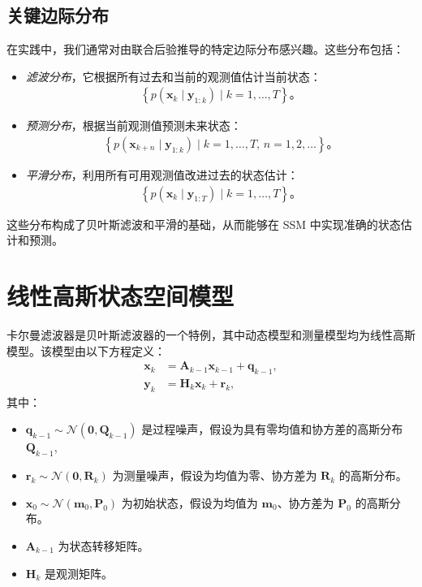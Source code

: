 \subsection{关键边际分布}
在实践中，我们通常对由联合后验推导的特定边际分布感兴趣。这些分布包括：
\begin{itemize}
\item \textit{滤波分布}，它根据所有过去和当前的观测值估计当前状态：
\begin{align*}
\left\{ p(\mathbf{x}_k \mid \mathbf{y}_{1:k}) \mid k = 1, \dots, T \right\}。
\end{align*}
\item \textit{预测分布}，根据当前观测值预测未来状态：
\begin{align*}
\left\{ p(\mathbf{x}_{k+n} \mid \mathbf{y}_{1:k}) \mid k = 1, \dots, T, \, n = 1, 2, \dots \right\}。
\end{align*}
\item \textit{平滑分布}，利用所有可用观测值改进过去的状态估计：
\begin{align*}
\left\{ p(\mathbf{x}_k \mid \mathbf{y}_{1:T}) \mid k = 1, \dots, T \right\}。
\end{align*}
\end{itemize}
这些分布构成了贝叶斯滤波和平滑的基础，从而能够在 SSM 中实现准确的状态估计和预测。

\section{线性高斯状态空间模型}
卡尔曼滤波器是贝叶斯滤波器的一个特例，其中动态模型和测量模型均为线性高斯模型。该模型由以下方程定义：
\begin{align*}
\mathbf{x}_k &= \mathbf{A}_{k-1} \mathbf{x}_{k-1} + \mathbf{q}_{k-1}, \\
\mathbf{y}_k &= \mathbf{H}_k \mathbf{x}_k + \mathbf{r}_k,
\end{align*}
其中：
\begin{itemize}
\item \(\mathbf{q}_{k-1} \sim \mathcal{N}(\mathbf{0}, \mathbf{Q}_{k-1})\) 是过程噪声，假设为具有零均值和协方差的高斯分布\(\mathbf{Q}_{k-1}\),
\item \(\mathbf{r}_k \sim \mathcal{N}(\mathbf{0}, \mathbf{R}_k)\) 为测量噪声，假设为均值为零、协方差为 \(\mathbf{R}_k\) 的高斯分布。
\item \(\mathbf{x}_0 \sim \mathcal{N}(\mathbf{m}_0, \mathbf{P}_0)\) 为初始状态，假设为均值为 \(\mathbf{m}_0\)、协方差为 \(\mathbf{P}_0\) 的高斯分布。
\item \(\mathbf{A}_{k-1}\) 为状态转移矩阵。
\item \(\mathbf{H}_k\) 是观测矩阵。
\end{itemize}

